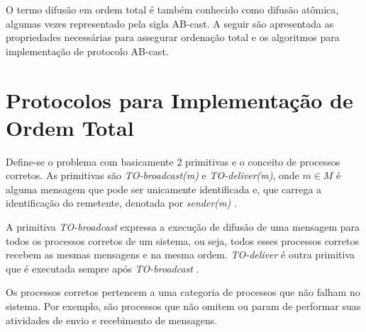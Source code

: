 O termo difusão em ordem total é também conhecido como difusão atômica, algumas vezes representado pela sigla \gls{AB-cast}. A seguir são apresentada as propriedades necessárias para assegurar ordenação total e os algoritmos para implementação de protocolo AB-cast.



\section{Protocolos para Implementação de Ordem Total}

Define-se o problema com basicamente 2 primitivas e o conceito de processos corretos. As primitivas são \textit{TO-broadcast(m)} e \textit{TO-deliver(m)}, onde $m \in M$ é alguma mensagem que pode ser unicamente identificada e, que carrega a identificação do remetente, denotada por \textit{sender(m)} \cite{PauloVerissimoLuisRodrigues}.

A primitiva \textit{TO-broadcast} expressa a execução de difusão de uma mensagem para todos os processos corretos de um sistema, ou seja, todos esses processos corretos recebem as mesmas mensagens e na mesma ordem. \textit{TO-deliver} é outra primitiva que é executada sempre após \textit{TO-broadcast} \cite{PauloVerissimoLuisRodrigues}.

Os processos corretos pertencem a uma categoria de processos que não falham no sistema. Por exemplo, são processos que não omitem ou param de performar suas atividades de envio e recebimento de mensagens.


